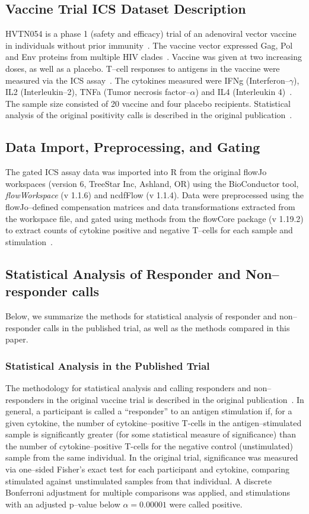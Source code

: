 \documentclass[11pt]{article}
\begin{document}
\subsection*{Vaccine Trial ICS Dataset Description}
HVTN054 is a phase 1 (safety and efficacy) trial of an adenoviral vector vaccine in individuals without prior immunity~\cite{Peiperl:2010ej}. The vaccine vector expressed Gag, Pol and Env proteins from multiple HIV clades~\cite{Peiperl:2010ej}. Vaccine was given at two increasing doses, as well as a placebo. T--cell responses to antigens in the vaccine were measured via the ICS assay~\cite{Peiperl:2010ej,Horton:2007tsa}. The cytokines measured were IFNg (Interferon--$\gamma$), IL2 (Interleukin--2), TNFa (Tumor necrosis factor--$\alpha$) and IL4 (Interleukin 4)~\cite{Horton:2007tsa}. The sample size consisted of 20 vaccine and four placebo recipients. Statistical analysis of the original positivity calls is described in the original publication~\cite{Peiperl:2010ej}.
 
 
\subsection*{Data Import, Preprocessing, and Gating}
The gated ICS assay data was imported into R from the original flowJo workspaces (version 6, TreeStar Inc, Ashland, OR)  using the BioConductor tool, \textit{flowWorkspace} (v 1.1.6) and ncdfFlow (v 1.1.4). Data were preprocessed using the flowJo--defined compensation matrices and data transformations extracted from the workspace file, and gated using methods from the flowCore package (v 1.19.2) to extract counts of cytokine positive and negative T--cells for each sample and stimulation~\cite{Hahne:2009vv}.

\subsection*{Statistical Analysis of Responder and Non--responder calls}
Below, we summarize the methods for statistical analysis of responder and non--responder calls in the published trial, as well as the methods compared in this paper.
\subsubsection*{Statistical Analysis in the Published Trial}
The methodology for statistical analysis and calling responders and non--responders in the original vaccine trial is described in the original publication~\cite{Peiperl:2010ej}. In general, a participant is called a ``responder'' to an antigen stimulation if, for a given cytokine, the number of cytokine--positive T-cells in the antigen--stimulated sample is significantly greater (for some statistical measure of significance) than the number of cytokine--positive T-cells for the negative control (unstimulated) sample from the same individual. In the original trial, significance was measured via one--sided Fisher's exact test for each participant and cytokine, comparing stimulated against unstimulated samples from that individual. A discrete Bonferroni adjustment for multiple comparisons was applied, and stimulations with an adjusted p--value below $\alpha = 0.00001$ were called positive. 
\end{document}
